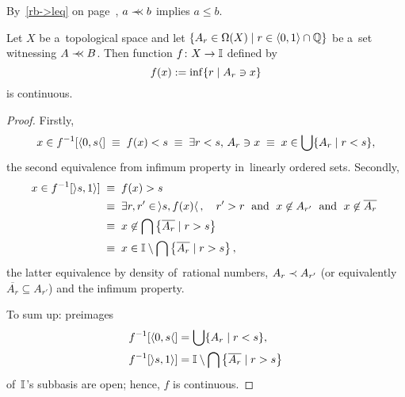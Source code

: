 \begin{rem}
  By~\ref{rb->leq} on page~\pageref{rb->leq}\thinspace, $a \prec\mkern-8mu\prec b$
  implies $a \le b$.
\end{rem}

\begin{lem} \label{cb->continuous}
  Let $X$ be a~topological space and let $\{A_r\in \Omega(X) \mid r\in \langle
  0, 1 \rangle \cap \mathbb{Q}\}$ be a~set witnessing $A \prec\mkern-8mu\prec B$.
  Then function $f\colon X \to \mathbb{I}$ defined by
  \[
    f(x) := \inf \{r \mid A_r \owns x\}
  \]
  is continuous.
\end{lem}
\begin{proof}
  Firstly,
  \[
    x\in f^{-1}[\langle 0, s \langle] \; \equiv \;
    f(x) < s \; \equiv \;
    \exists r < s, \, A_r \owns x \; \equiv \;
    x\in \bigcup \{ A_r \mid r < s \},
  \]
  the second equivalence from infimum property in~linearly ordered sets.
  Secondly,
  \begin{align*}
    x\in f^{-1}[\rangle s, 1 \rangle] \; &\equiv \;
    f(x) > s \\
    &\equiv \; \exists r, r' \in \,\rangle s, f(x) \langle\,, \quad  r' > r
    \;\text{ and }\; x\not\in A_{r'} \;\text{ and }\; x\not\in \overline{A_r}
    \; \\
    &\equiv \; x\not\in \bigcap \left\{ \overline{A_r} \mid r > s \right\} \\
    &\equiv \; x\in \mathbb{I}\setminus \bigcap \left\{ \overline{A_r} \mid r > s
    \right\},
  \end{align*}
  the latter equivalence by density of~rational numbers, $A_r \prec A_{r'}$ (or
  equivalently $\overline{A_r}\subseteq A_{r'}$) and the infimum property.

  To sum up: preimages
  \begin{align*}
    f^{-1}[\langle 0, s \langle] &= \bigcup \{ A_r \mid r < s \}, \\
    f^{-1}[\rangle s, 1 \rangle] &= \mathbb{I}\setminus \bigcap \left\{ \overline{A_r} \mid r > s \right\}
  \end{align*}
  of~$\mathbb{I}$'s subbasis are open;
  hence, $f$ is continuous.
\end{proof}


